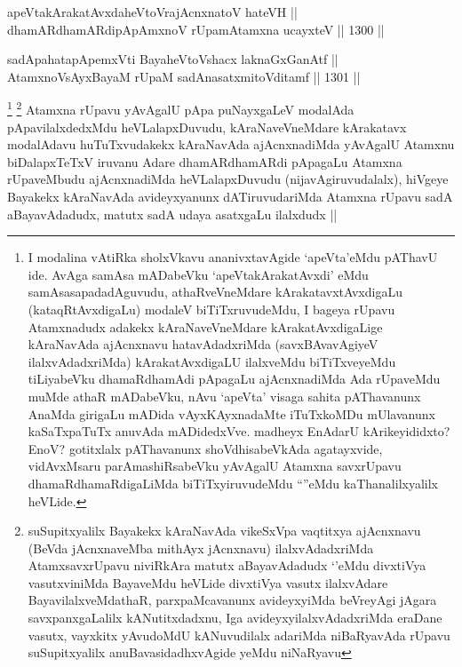 
\begin{shl}
apeVtakArakatAvxdaheVtoVrajAcnxnatoV hateVH || \\
dhamARdhamARdipApAmxnoV rUpamAtamxna ucayxteV ||  1300 ||  
\end{shl}
				
\begin{shl}
sadA\s pahatapApemxVti BayaheVtoVshacx laknaGxGanAtf ||  \\
AtamxnoV\s sAyxBayaM rUpaM sadA\s nasatxmitoVditamf ||  1301 ||  
\end{shl}

\begin{artha}
\footnote{I modalina vAtiRka sholxVkavu ananivxtavAgide `apeVta'eMdu pAThavU ide. AvAga samAsa mADabeVku `apeVtakArakatAvxdi' eMdu samAsasapadadAguvudu, athaRveVneMdare kArakatavxtAvxdigaLu (kataqRtAvxdigaLu) modaleV biTiTxruvudeMdu, I bageya rUpavu Atamxnadudx adakekx kAraNaveVneMdare kArakatAvxdigaLige kAraNavAda ajAcnxnavu hatavAdadxriMda (savxBAvavAgiyeV ilalxvAdadxriMda) kArakatAvxdigaLU ilalxveMdu biTiTxveyeMdu tiLiyabeVku dhamaRdhamAdi pApagaLu ajAcnxnadiMda Ada rUpaveMdu muMde athaR mADabeVku, nAvu `apeVta' visaga sahita pAThavanunx AnaMda girigaLu mADida vAyxKAyxnadaMte iTuTxkoMDu mUlavanunx kaSaTxpaTuTx anuvAda mADidedxVve. madheyx EnAdarU kArikeyididxto? EnoV? gotitxlalx pAThavanunx shoVdhisabeVkAda agatayxvide, vidAvxMsaru parAmashiRsabeVku yAvAgalU Atamxna savxrUpavu dhamaRdhamaRdigaLiMda biTiTxyiruvudeMdu ``\stext''eMdu kaThanalilxyalilx heVLide.}
\footnote{suSupitxyalilx Bayakekx kAraNavAda vikeSxVpa vaqtitxya ajAcnxnavu (BeVda jAcnxnaveMba mithAyx jAcnxnavu) ilalxvAdadxriMda AtamxsavxrUpavu niviRkAra matutx aBayavAdadudx `\stext'eMdu divxtiVya vasutxviniMda BayaveMdu heVLide divxtiVya vasutx ilalxvAdare BayavilalxveMdathaR, parxpaMcavanunx avideyxyiMda beVreyAgi jAgara savxpanxgaLalilx kANutitxdadxnu, Iga avideyxyilalxvAdadxriMda eraDane vasutx, vayxkitx yAvudoMdU kANuvudilalx adariMda niBaRyavAda rUpavu suSupitxyalilx anuBavasidadhxvAgide yeMdu niNaRyavu}
Atamxna rUpavu yAvAgalU pApa puNayxgaLeV modalAda pApavilalxdedxMdu heVLalapxDuvudu, kAraNaveVneMdare kArakatavx modalAdavu huTuTxvudakekx kAraNavAda ajAcnxnadiMda yAvAgalU Atamxnu biDalapxTeTxV iruvanu Adare dhamARdhamARdi pApagaLu Atamxna rUpaveMbudu ajAcnxnadiMda heVLalapxDuvudu (nijavAgiruvudalalx), hiVgeye Bayakekx kAraNavAda avideyxyanunx dATiruvudariMda Atamxna rUpavu sadA aBayavAdadudx, matutx sadA udaya asatxgaLu ilalxdudx ||
\end{artha}

